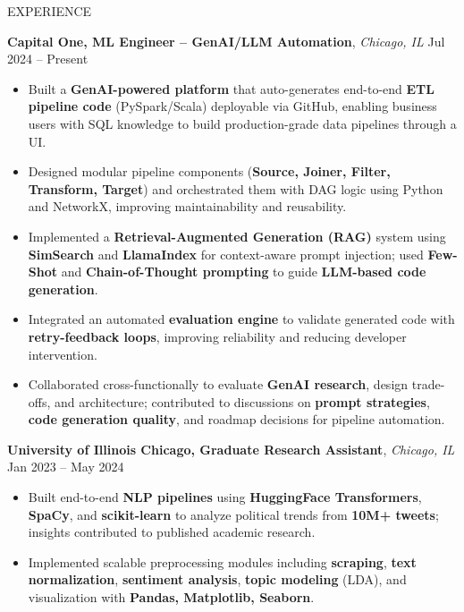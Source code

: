\documentclass{resume} %
\begin{document}
\vspace{-0.2em}
\begin{rSection}{EXPERIENCE} 

\textbf{Capital One, ML Engineer – GenAI/LLM Automation}, \textit{Chicago, IL} \hfill Jul 2024 – Present
\vspace{-0.5em}  %

\begin{itemize}
  \item Built a \textbf{GenAI-powered platform} that auto-generates end-to-end \textbf{ETL pipeline code} (PySpark/Scala) deployable via GitHub, enabling business users with SQL knowledge to build production-grade data pipelines through a UI.
  \item Designed modular pipeline components (\textbf{Source, Joiner, Filter, Transform, Target}) and orchestrated them with DAG logic using Python and NetworkX, improving maintainability and reusability.

  \item Implemented a \textbf{Retrieval-Augmented Generation (RAG)} system using \textbf{SimSearch} and \textbf{LlamaIndex} for context-aware prompt injection; used \textbf{Few-Shot} and \textbf{Chain-of-Thought prompting} to guide \textbf{LLM-based code generation}.

  \item Integrated an automated \textbf{evaluation engine} to validate generated code with \textbf{retry-feedback loops}, improving reliability and reducing developer intervention.

  \item Collaborated cross-functionally to evaluate \textbf{GenAI research}, design trade-offs, and architecture; contributed to discussions on \textbf{prompt strategies}, \textbf{code generation quality}, and roadmap decisions for pipeline automation.
\end{itemize}


\vspace{-0.4em}
\textbf{University of Illinois Chicago, Graduate Research Assistant}, \textit{Chicago, IL} \hfill Jan 2023 – May 2024
\vspace{-0.5em}  %

\begin{itemize}
\itemsep -3pt {}
    \item Built end-to-end \textbf{NLP pipelines} using \textbf{HuggingFace Transformers}, \textbf{SpaCy}, and \textbf{scikit-learn} to analyze political trends from \textbf{10M+ tweets}; insights contributed to published academic research.
    \item Implemented scalable preprocessing modules including \textbf{scraping}, \textbf{text normalization}, \textbf{sentiment analysis}, \textbf{topic modeling} (LDA), and visualization with \textbf{Pandas, Matplotlib, Seaborn}.
\end{itemize}



\end{rSection}
\end{document}
